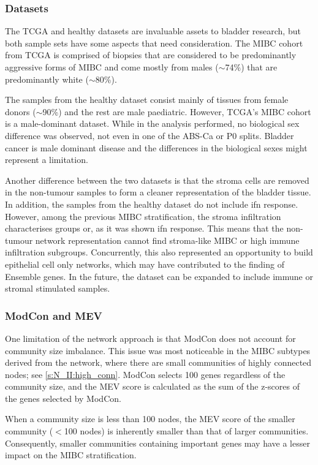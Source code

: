 \subsubsection*{Datasets}

The TCGA and healthy datasets are invaluable assets to bladder research, but both sample sets have some aspects that need consideration. The MIBC cohort from TCGA is comprised of biopsies that are considered to be predominantly aggressive forms of MIBC and come mostly from males (\(\sim\)74\%) that are predominantly white (\(\sim\)80\%).

The samples from the healthy dataset consist mainly of tissues from female donors (\(\sim\)90\%) and the rest are male paediatric. However, TCGA's MIBC cohort is a male-dominant dataset. While in the analysis performed, no biological sex difference was observed, not even in one of the ABS-Ca or P0 splits. Bladder cancer is male dominant disease and the differences in the biological sexes might represent a limitation.

Another difference between the two datasets is that the stroma cells are removed in the non-tumour samples to form a cleaner representation of the bladder tissue. In addition, the samples from the healthy dataset do not include \acrlong{ifn} response. However, among the previous MIBC stratification, the stroma infiltration characterises groups or, as it was shown \acrshort{ifn} response. This means that the non-tumour network representation cannot find stroma-like MIBC or high immune infiltration subgroups. Concurrently, this also represented an opportunity to build epithelial cell only networks, which may have contributed to the finding of Ensemble genes. In the future, the dataset can be expanded to include immune or stromal stimulated samples.


\subsubsection*{ModCon and MEV}

One limitation of the network approach is that ModCon does not account for community size imbalance. This issue was most noticeable in the MIBC subtypes derived from the network, where there are small communities of highly connected nodes; see \cref{s:N_II:high_conn}. ModCon selects 100 genes regardless of the community size, and the MEV score is calculated as the sum of the z-scores of the genes selected by ModCon.

When a community size is less than 100 nodes, the MEV score of the smaller community (\(<\)100 nodes) is inherently smaller than that of larger communities. Consequently, smaller communities containing important genes may have a lesser impact on the MIBC stratification.


